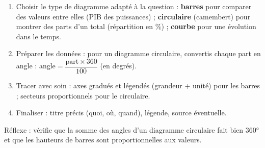 \documentclass[11pt]{article}
\newcommand{\cle}[1]{{\popxbold\color{popdark}#1}}
\begin{document}
\begin{methode}
\begin{enumerate}
\item \cle{Choisir le type de diagramme} adapté à la question : \textbf{barres} pour comparer des valeurs entre elles (PIB des puissances) ; \textbf{circulaire} (camembert) pour montrer des parts d'un total (répartition en \%) ; \textbf{courbe} pour une évolution dans le temps.
\item \cle{Préparer les données} : pour un diagramme circulaire, convertis chaque part en angle : $\text{angle} = \dfrac{\text{part} \times 360}{100}$ (en degrés).
\item \cle{Tracer avec soin} : axes gradués et légendés (grandeur + unité) pour les barres ; secteurs proportionnels pour le circulaire.
\item \cle{Finaliser} : titre précis (quoi, où, quand), légende, source éventuelle.
\end{enumerate}
Réflexe : vérifie que la somme des angles d'un diagramme circulaire fait bien $360°$ et que les hauteurs de barres sont proportionnelles aux valeurs.
\end{methode}
\end{document}

